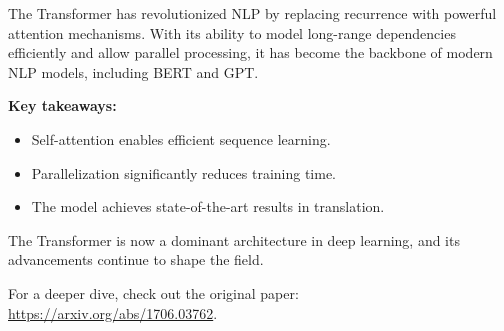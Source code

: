 \documentclass{article}
\begin{document}
The Transformer has revolutionized NLP by replacing recurrence with powerful attention mechanisms. With its ability to model long-range dependencies efficiently and allow parallel processing, it has become the backbone of modern NLP models, including BERT and GPT.

\textbf{Key takeaways:}
\begin{itemize}
    \item Self-attention enables efficient sequence learning.
    \item Parallelization significantly reduces training time.
    \item The model achieves state-of-the-art results in translation.
\end{itemize}

The Transformer is now a dominant architecture in deep learning, and its advancements continue to shape the field.

\vspace{10pt}
For a deeper dive, check out the original paper: \url{https://arxiv.org/abs/1706.03762}.
\end{document}
